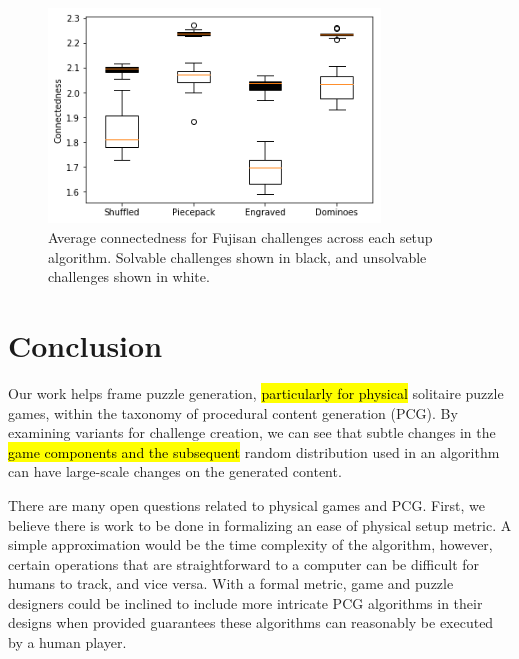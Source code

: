 \documentclass[journal]{IEEEtran}
\begin{document}
\begin{figure}[t]
\includegraphics[width=8.8cm]{connectedness2.png}
\caption{Average connectedness for Fujisan challenges across each setup algorithm. 
Solvable challenges shown in black, and unsolvable challenges shown in white.}
\label{fig:connected}
\end{figure}



\section{Conclusion}   \label{sec:Conclusion}

\noindent
Our work helps frame puzzle generation, \hl{particularly for physical} solitaire puzzle games, within the taxonomy of procedural content generation (PCG). By examining variants for challenge creation, we can see that subtle changes in the \hl{game components and the subsequent} random distribution used in an algorithm can have large-scale changes on the generated content.

There are many open questions related to physical games and PCG. First, we believe there is work to be done in formalizing an ease of physical setup metric. A simple approximation would be the time complexity of the algorithm, however, certain operations that are straightforward to a computer can be difficult for humans to track, and vice versa. With a formal metric, game and puzzle designers could be inclined to include more intricate PCG algorithms in their designs when provided guarantees these algorithms can reasonably be executed by a human player.


\end{document}
